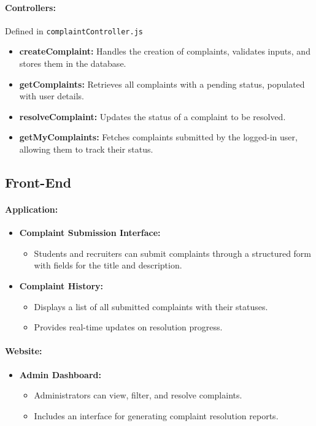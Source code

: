 \paragraph{Controllers:} Defined in \texttt{complaintController.js}
\begin{itemize}
    \item \textbf{createComplaint:} Handles the creation of complaints, validates inputs, and stores them in the database.
    \item \textbf{getComplaints:} Retrieves all complaints with a pending status, populated with user details.
    \item \textbf{resolveComplaint:} Updates the status of a complaint to be resolved.
    \item \textbf{getMyComplaints:} Fetches complaints submitted by the logged-in user, allowing them to track their status.
\end{itemize}

\subsection*{Front-End}
\paragraph{Application:}
\begin{itemize}
    \item \textbf{Complaint Submission Interface:}
    \begin{itemize}
        \item Students and recruiters can submit complaints through a structured form with fields for the title and description.
    \end{itemize}
    \item \textbf{Complaint History:}
    \begin{itemize}
        \item Displays a list of all submitted complaints with their statuses.
        \item Provides real-time updates on resolution progress.
    \end{itemize}
\end{itemize}

\paragraph{Website:}
\begin{itemize}
    \item \textbf{Admin Dashboard:}
    \begin{itemize}
        \item Administrators can view, filter, and resolve complaints.
        \item Includes an interface for generating complaint resolution reports.
    \end{itemize}
\end{itemize}
